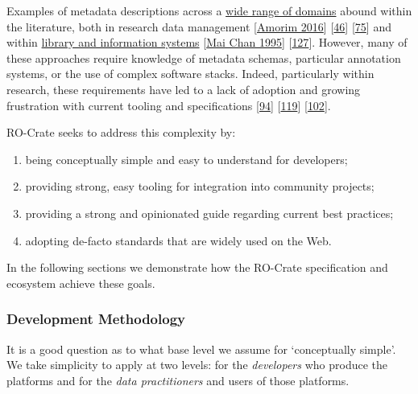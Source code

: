 Examples of metadata descriptions across a
\href{https://rdamsc.bath.ac.uk/scheme-index}{wide range of domains}
abound within the literature, both in research data management
{[}\href{https://doi.org/10.1007/s10209-016-0475-y}{Amorim 2016}{]}
{[}\href{https://dcpapers.dublincore.org/pubs/article/view/3714}{46}{]}
{[}\href{https://doi.org/10.2777/620649}{75}{]} and within
\href{https://www.loc.gov/librarians/standards}{library and information
systems} {[}\href{https://identifiers.org/isbn/9781563081910}{Mai Chan 1995}{]}
{[}\href{https://doi.org/10.1515/9783598441844}{127}{]}. However, many
of these approaches require knowledge of metadata schemas, particular
annotation systems, or the use of complex software stacks. Indeed,
particularly within research, these requirements have led to a lack of
adoption and growing frustration with current tooling and specifications
{[}\href{https://cameronneylon.net/blog/as-a-researcher-im-a-bit-bloody-fed-up-with-data-management/}{94}{]}
{[}\href{https://doi.org/10.1007/s00267-014-0258-2}{119}{]}
{[}\href{https://doi.org/10.1038/s41597-020-0524-5}{102}{]}.

RO-Crate seeks to address this complexity by:

\begin{enumerate}
\def\labelenumi{\arabic{enumi}.}
\tightlist
\item
  being conceptually simple and easy to understand for developers;
\item
  providing strong, easy tooling for integration into community
  projects;
\item
  providing a strong and opinionated guide regarding current best
  practices;
\item
  adopting de-facto standards that are widely used on the Web.
\end{enumerate}

In the following sections we demonstrate how the RO-Crate specification
and ecosystem achieve these goals.

\hypertarget{methodology}{%
\subsubsection{Development Methodology}\label{methodology}}

It is a good question as to what base level we assume for `conceptually
simple'. We take simplicity to apply at two levels: for the
\emph{developers} who produce the platforms and for the \emph{data
practitioners} and users of those platforms.

